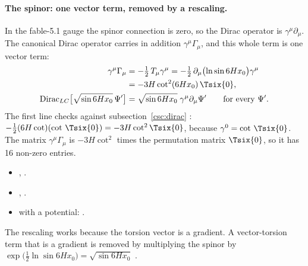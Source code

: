 \paragraph{The spinor: one vector term, removed by a rescaling.} In the fable-5.1 gauge the spinor
connection is zero, so the Dirac operator is $\gamma^\mu\partial_\mu$. The canonical Dirac operator
carries in addition $\gamma^\mu\Gamma_\mu$, and this whole term is one vector term:
\begin{align}
  \gamma^\mu\Gamma_\mu&=-\tfrac12\,T_\mu\gamma^\mu=-\tfrac12\,\partial_\mu\bigl(\ln\sin 6Hx_0\bigr)\gamma^\mu
     \notag\\
     &=-3H\cot^2(6Hx_0)\,\Tsix{0},\label{csc:eq:vectorterm}\\
  \mathrm{Dirac}_{LC}\bigl[\sqrt{\sin 6Hx_0}\,\Psi'\bigr]&=\sqrt{\sin 6Hx_0}\;\gamma^\mu\partial_\mu\Psi'\qquad\text{for every }\Psi'.
\end{align}
The first line checks against subsection~\ref{csc:dirac} \cfderived:
$-\tfrac12(6H\cot)(\cot\,\Tsix{0})=-3H\cot^2\Tsix{0}$, because $\gamma^0=\cot\,\Tsix{0}$. The matrix
$\gamma^\mu\Gamma_\mu$ is $-3H\cot^2$ times the permutation matrix $\Tsix{0}$, so it has 16
non-zero entries.
\begin{itemize}
  \item {} , .
  \item {} , .
  \item {} with a potential: .
\end{itemize}
The rescaling works because the torsion vector is a gradient. A vector-torsion term that is a
gradient is removed by multiplying the spinor by
$\exp\bigl(\tfrac12\ln\sin 6Hx_0\bigr)=\sqrt{\sin 6Hx_0}$ \cfderived.

